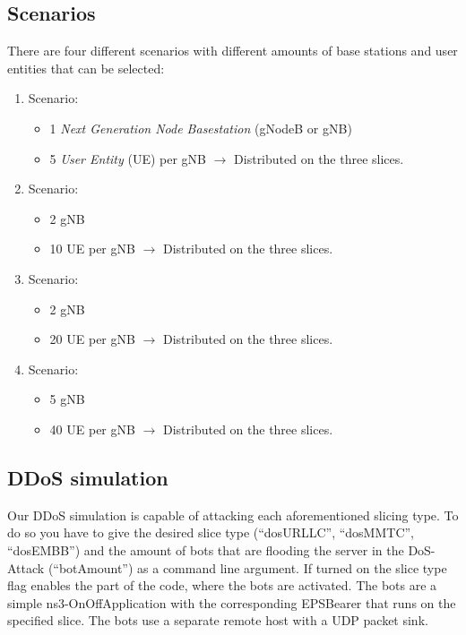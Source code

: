     \subsection{Scenarios}
    There are four different scenarios with different amounts of base stations and user entities that can be selected:
    \begin{enumerate}
        \item Scenario:
            \begin{itemize}
                \item 1 \textit{Next Generation Node Basestation} (gNodeB or gNB)
                \item 5 \textit{User Entity} (UE) per gNB $\rightarrow{}$ Distributed on the three slices.
            \end{itemize}
        \item Scenario:
        \begin{itemize}
            \item 2 gNB
            \item 10 UE per gNB $\rightarrow{}$ Distributed on the three slices.
        \end{itemize}
        \item Scenario:
        \begin{itemize}
            \item 2 gNB
	        \item 20 UE per gNB $\rightarrow{}$ Distributed on the three slices.
        \end{itemize}
        \item Scenario:
        \begin{itemize}
            \item 5 gNB
            \item 40 UE per gNB $\rightarrow{}$ Distributed on the three slices.
        \end{itemize}
    \end{enumerate}
    
    
    \subsection{DDoS simulation}
    Our DDoS simulation is capable of attacking each aforementioned slicing type. To do so you have to give the desired slice type (``dosURLLC'', ``dosMMTC'', ``dosEMBB'') and the amount of bots that are flooding the server in the DoS-Attack (``botAmount'') as a command line argument. If turned on the slice type flag enables the part of the code, where the bots are activated. 
    The bots are a simple ns3-OnOffApplication with the corresponding EPSBearer that runs on the specified slice.
    The bots use a separate remote host with a UDP packet sink.    